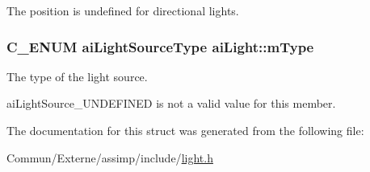 The position is undefined for directional lights. 
\subsubsection[{\texorpdfstring{m\+Type}{mType}}]{\setlength{\rightskip}{0pt plus 5cm}C\+\_\+\+E\+N\+UM {\bf ai\+Light\+Source\+Type} ai\+Light\+::m\+Type}\hypertarget{structai_light_a4cba1741875dd92724ff55be91c60c2b}{}\label{structai_light_a4cba1741875dd92724ff55be91c60c2b}
The type of the light source.

ai\+Light\+Source\+\_\+\+U\+N\+D\+E\+F\+I\+N\+ED is not a valid value for this member. 

The documentation for this struct was generated from the following file\+:\begin{DoxyCompactItemize}
\item 
Commun/\+Externe/assimp/include/\hyperlink{light_8h}{light.\+h}\end{DoxyCompactItemize}
